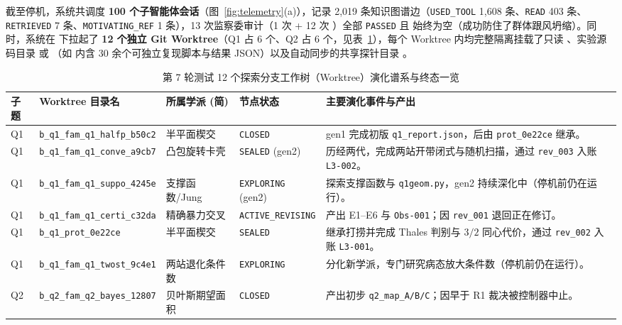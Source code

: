 \documentclass[11pt,a4paper]{ctexart}
\theoremstyle{remark}
\begin{document}
截至停机，系统共调度 \textbf{100 个子智能体会话}（图~\ref{fig:telemetry}(a)），记录 2,019 条知识图谱边（\texttt{USED\_TOOL} 1,608 条、\texttt{READ} 403 条、\texttt{RETRIEVED} 7 条、\texttt{MOTIVATING\_REF} 1 条），13 次监察委审计（1 次  + 12 次 ）全部 \texttt{PASSED} 且  始终为空（成功防住了群体跟风坍缩）。同时，系统在  下拉起了 \textbf{12 个独立 Git Worktree}（Q1 占 6 个、Q2 占 6 个，见表~\ref{tab:worktrees}），每个 Worktree 内均完整隔离挂载了只读 、实验源码目录  或 （如  内含 30 余个可独立复现脚本与结果 JSON）以及自动同步的共享探针目录 。

\begin{table}[htbp]
\centering
\caption{第 7 轮测试 12 个探索分支工作树（Worktree）演化谱系与终态一览}
\label{tab:worktrees}
\small
\begin{tabularx}{\textwidth}{@{}llll>{\raggedright\arraybackslash}X@{}}
\toprule
\textbf{子题} & \textbf{Worktree 目录名} & \textbf{所属学派 (简)} & \textbf{节点状态} & \textbf{主要演化事件与产出} \\
\midrule
Q1 & \texttt{b\_q1\_fam\_q1\_halfp\_b50c2} & 半平面楔交 & \texttt{CLOSED} & gen1 完成初版 \texttt{q1\_report.json}，后由 \texttt{prot\_0e22ce} 继承。 \\
Q1 & \texttt{b\_q1\_fam\_q1\_conve\_a9cb7} & 凸包旋转卡壳 & \texttt{SEALED} (gen2) & 历经两代，完成两站开带闭式与随机扫描，通过 \texttt{rev\_003} 入账 \texttt{L3-002}。 \\
Q1 & \texttt{b\_q1\_fam\_q1\_suppo\_4245e} & 支撑函数/Jung & \texttt{EXPLORING} (gen2) & 探索支撑函数与 \texttt{q1geom.py}，gen2 持续深化中（停机前仍在运行）。 \\
Q1 & \texttt{b\_q1\_fam\_q1\_certi\_c32da} & 精确暴力交叉 & \texttt{ACTIVE\_REVISING} & 产出 E1--E6 与 \texttt{Obs-001}；因 \texttt{rev\_001} 退回正在修订。 \\
Q1 & \texttt{b\_q1\_prot\_0e22ce} & 半平面楔交 & \texttt{SEALED} & 继承打捞并完成 Thales 判别与 $3/2$ 同心代价，通过 \texttt{rev\_002} 入账 \texttt{L3-001}。 \\
Q1 & \texttt{b\_q1\_fam\_q1\_twost\_9c4e1} & 两站退化条件数 & \texttt{EXPLORING} & 分化新学派，专门研究病态放大条件数（停机前仍在运行）。 \\
\midrule
Q2 & \texttt{b\_q2\_fam\_q2\_bayes\_12807} & 贝叶斯期望面积 & \texttt{CLOSED} & 产出初步 \texttt{q2\_map\_A/B/C}；因早于 R1 裁决被控制器中止。 \\

\end{tabularx}
\end{table}
\end{document}
